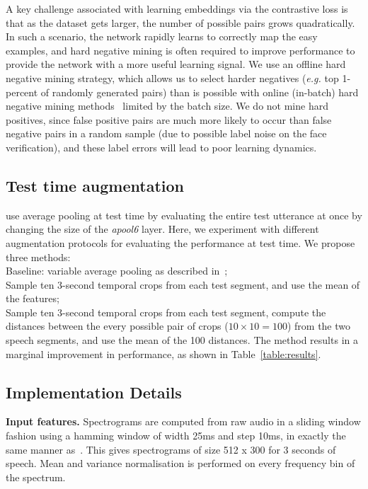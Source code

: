 \documentclass[a4paper]{article}
\def\newpara{\vspace{2pt}}
\def\subsec{\vspace{-5pt}}
\begin{document}
A key challenge associated with learning embeddings via the contrastive loss is that as the dataset gets larger, the number of possible pairs grows quadratically. In such a scenario, the network rapidly learns to correctly map the easy examples, and hard negative mining  is often required to improve performance to provide the network with a more useful learning signal. We use an offline hard negative mining strategy, which allows us to select harder negatives ({\em e.g.} top 1-percent of randomly generated pairs) than is possible with online (in-batch) hard negative mining methods~\cite{sung1996learning,hermans2017defense,song2016deep} limited by the batch size. We do not mine hard positives, since false positive pairs are much more likely to occur than false negative pairs in a random sample (due to possible label noise on the face verification), and these label errors will lead to poor learning dynamics.

\subsection{Test time augmentation}
\subsec
\label{subsec:testaug}
\cite{Nagrani17} use average pooling at test time by evaluating the entire test utterance at once by changing the size of the {\it apool6} layer. Here, we experiment with different augmentation protocols for evaluating the performance at test time. We propose three methods:\\
 Baseline: variable average pooling as described in~\cite{Nagrani17};\\
 Sample ten 3-second temporal crops from each test segment, and use the mean of the features;\\
 Sample ten 3-second temporal crops from each test segment, compute the distances between the every possible pair of crops ($10\times10=100$) from the two speech segments, and use the mean of the 100 distances.
The method results in a marginal improvement in performance, as shown in Table~\ref{table:results}.


\subsection{Implementation Details} 
\subsec
\newpara\noindent\textbf{Input features.} 
Spectrograms are computed from raw audio  in a sliding window fashion using a hamming window of width 25ms and step
10ms, in exactly the same manner as~\cite{Nagrani17}. This gives spectrograms of size 512 x 300 for
3 seconds of speech.  Mean and variance normalisation is performed on every frequency bin of the spectrum.
\end{document}

